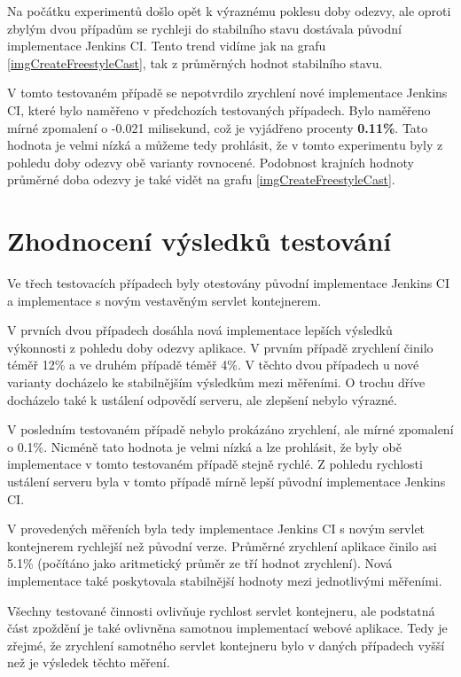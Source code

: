             Na počátku experimentů došlo opět k výraznému poklesu doby odezvy, ale oproti
            zbylým dvou případům se rychleji do stabilního stavu dostávala původní implementace Jenkins CI.
            Tento trend vidíme jak na grafu \ref{imgCreateFreestyleCast}, tak z průměrných
            hodnot stabilního stavu.

            V tomto testovaném případě se nepotvrdilo zrychlení nové implementace Jenkins CI,
            které bylo naměřeno v předchozích testovaných případech. Bylo naměřeno
            mírné zpomalení o -0.021 milisekund, což je vyjádřeno procenty \textbf{0.11\%}.
            Tato hodnota je velmi nízká a můžeme tedy prohlásit, že v tomto experimentu
            byly z pohledu doby odezvy obě varianty rovnocené.
            Podobnost krajních hodnoty průměrné doba odezvy je také vidět na grafu \ref{imgCreateFreestyleCast}.


    \section{Zhodnocení výsledků testování} \label{kapPerfVysledky}
        Ve třech testovacích případech byly otestovány původní implementace Jenkins CI
        a implementace s novým vestavěným servlet kontejnerem.

        V prvních dvou případech dosáhla nová implementace lepších výsledků
        výkonnosti z pohledu doby odezvy aplikace. V prvním případě zrychlení činilo téměř 12\%
        a ve druhém případě téměř 4\%. V těchto dvou případech u nové varianty
        docházelo ke stabilnějším výsledkům mezi měřeními. O trochu dříve docházelo
        také k ustálení odpovědí serveru, ale zlepšení nebylo výrazné.

        V posledním testovaném případě nebylo prokázáno zrychlení, ale mírné zpomalení o
        0.1\%. Nicméně tato hodnota je velmi nízká a lze prohlásit, že
        byly obě implementace v tomto testovaném případě stejně rychlé. 
        Z pohledu rychlosti ustálení serveru byla v tomto případě mírně lepší původní
        implementace Jenkins CI.

        \medskip
        V provedených měřeních byla tedy implementace Jenkins CI s novým
        servlet kontejnerem rychlejší než původní verze. Průměrné zrychlení
        aplikace činilo asi 5.1\% (počítáno jako aritmetický průměr ze tří hodnot zrychlení).
        Nová implementace také poskytovala stabilnější hodnoty mezi jednotlivými měřeními.

        Všechny testované činnosti ovlivňuje rychlost servlet kontejneru, ale podstatná část
        zpoždění je také ovlivněna samotnou implementací webové aplikace. Tedy je zřejmé, 
        že zrychlení samotného servlet kontejneru bylo v daných případech vyšší než
        je výsledek těchto měření.

